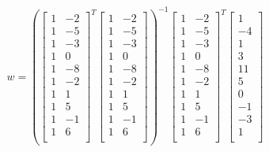 \documentclass[12pt]{article}
\begin{document}
\begin{enumerate}
\begin{enumerate}
	\begin{equation}
	\begin{split}
		w = (\begin{bmatrix}
			1 & -2\\
			1 & -5\\	
			1 & -3\\
			1 & 0\\
			1 & -8\\
			1 & -2\\
			1 & 1\\
			1 & 5\\
			1 & -1\\
			1 & 6\\
		\end{bmatrix}^{T}\begin{bmatrix}
			1 & -2\\
			1 & -5\\	
			1 & -3\\
			1 & 0\\
			1 & -8\\
			1 & -2\\
			1 & 1\\
			1 & 5\\
			1 & -1\\
			1 & 6\\
		\end{bmatrix})^{-1}\begin{bmatrix}
			1 & -2\\
			1 & -5\\	
			1 & -3\\
			1 & 0\\
			1 & -8\\
			1 & -2\\
			1 & 1\\
			1 & 5\\
			1 & -1\\
			1 & 6\\
		\end{bmatrix}^{T}\begin{bmatrix}
			1\\
			-4\\	
			1\\
			3\\
			11\\
			5\\
			0\\
			-1\\
			-3\\
			1\\
			\end{bmatrix}
		\end{split}
	\end{equation}


\end{enumerate}
\end{enumerate}
\end{document}
